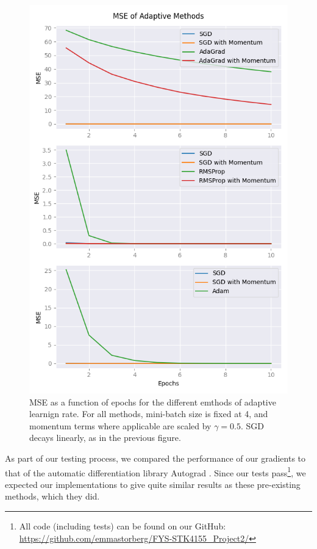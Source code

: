 \begin{figure}
    \centering
    \includegraphics[width=\linewidth]{figures/all_plots/MSEGD.png}
    \caption{MSE as a function of epochs for the different emthods of adaptive learnign rate. For all methods, mini-batch size is fixed at 4, and momentum terms where applicable are scaled by $\gamma = 0.5$. SGD decays linearly, as in the previous figure.}
    \label{fig:MSEGD}
\end{figure}

As part of our testing process, we compared the performance of our gradients to that of the automatic differentiation library Autograd \cite{autograd}. Since our tests pass\footnote{All code (including tests) can be found on our GitHub: \url{https://github.com/emmastorberg/FYS-STK4155_Project2/}}, we expected our implementations to give quite similar results as these pre-existing methods, which they did.
\vspace{3cm}

